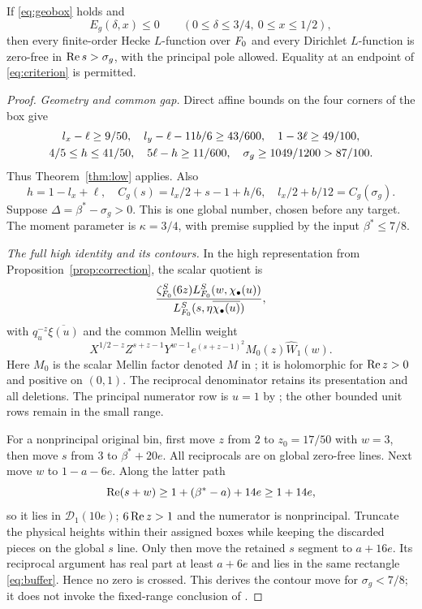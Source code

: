 \begin{theorem}\label{thm:geometry}
If \eqref{eq:geobox} holds and
\begin{equation}\label{eq:criterion}
 E_g(\delta,x)\le0\qquad(0\le\delta\le3/4,\ 0\le x\le1/2),
\end{equation}
then every finite-order Hecke $L$-function over ${F_0}$ and every Dirichlet $L$-function is zero-free in $\operatorname{Re} s>\sigma_g$, with the principal pole allowed. Equality at an endpoint of \eqref{eq:criterion} is permitted.
\end{theorem}
\begin{proof}
\emph{Geometry and common gap.}
Direct affine bounds on the four corners of the box give
\begin{gather}\label{eq:geomargins}
 l_x-\ell\ge9/50,\quad l_y-\ell-11b/6\ge43/600,\quad
 1-3\ell\ge49/100,\\
 4/5\le h\le41/50,\quad 5\ell-h\ge11/600,\quad
 \sigma_g\ge1049/1200>87/100.\notag
\end{gather}
Thus Theorem~\ref{thm:low} applies. Also
\begin{equation}\label{eq:signalgeometry}
 h=1-l_x+\ell,\quad C_g(s)=l_x/2+s-1+h/6,\quad
 l_x/2+b/12=C_g(\sigma_g).
\end{equation}
Suppose $\Delta=\beta^*-\sigma_g>0$. This is one global number, chosen before any target. The moment parameter is $\kappa=3/4$, with premise supplied by the input $\beta^*\le7/8$.

\emph{The full high identity and its contours.}
In the high representation from Proposition~\ref{prop:correction}, the scalar quotient is
\[
 \frac{\zeta_{F_0}^S(6z)L_{F_0}^S(w,\chi_\bullet(u))}
      {L_{F_0}^S(s,\eta\overline{\chi_\bullet(u)})},
\]
with $q_u^{-z}\overline{\xi(u)}$ and the common Mellin weight
\[
 X^{1/2-z}Z^{s+z-1}Y^{w-1}
 e^{(s+z-1)^2}M_0(z)\widehat W_1(w).
\]
Here $M_0$ is the scalar Mellin factor denoted $M$ in ; it is holomorphic for $\operatorname{Re} z>0$ and positive on $(0,1)$. The reciprocal denominator retains its presentation and all deletions. The principal numerator row is $u=1$ by ; the other bounded unit rows remain in the small range.

For a nonprincipal original bin, first move $z$ from $2$ to $z_0=17/50$ with $w=3$, then move $s$ from $3$ to $\beta^*+20e$. All reciprocals are on global zero-free lines. Next move $w$ to $1-a-6e$. Along the latter path
\[
 \operatorname{Re}(s+w)\ge1+(\beta^*-a)+14e\ge1+14e,
\]
so it lies in $\mathcal D_1(10e)$; $6\operatorname{Re} z>1$ and the numerator is nonprincipal. Truncate the physical heights within their assigned boxes while keeping the discarded pieces on the global $s$ line. Only then move the retained $s$ segment to $a+16e$. Its reciprocal argument has real part at least $a+6e$ and lies in the same rectangle \eqref{eq:buffer}. Hence no zero is crossed. This derives the contour move for $\sigma_g<7/8$; it does not invoke the fixed-range conclusion of .


\end{proof}
